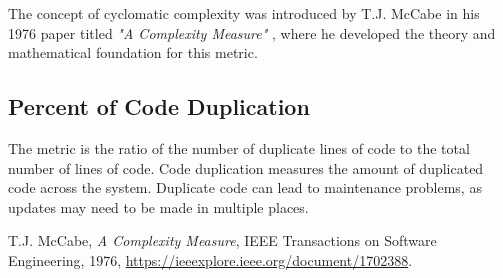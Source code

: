 \documentclass[12pt]{article}
\begin{document}
The concept of cyclomatic complexity was introduced by T.J. McCabe in his 1976 paper titled \textit{"A Complexity Measure"} \cite{mccabe1976complexity}, where he developed the theory and mathematical foundation for this metric. 

\subsection{Percent of Code Duplication}
The metric is the ratio of the number of duplicate lines of code to the total number of lines of code. Code duplication measures the amount of duplicated code across the system. Duplicate code can lead to maintenance problems, as updates may need to be made in multiple places.


\begin{thebibliography}{9}
    T.J. McCabe, \textit{A Complexity Measure}, IEEE Transactions on Software Engineering, 1976, \url{https://ieeexplore.ieee.org/document/1702388}.
\end{thebibliography}
\end{document}
